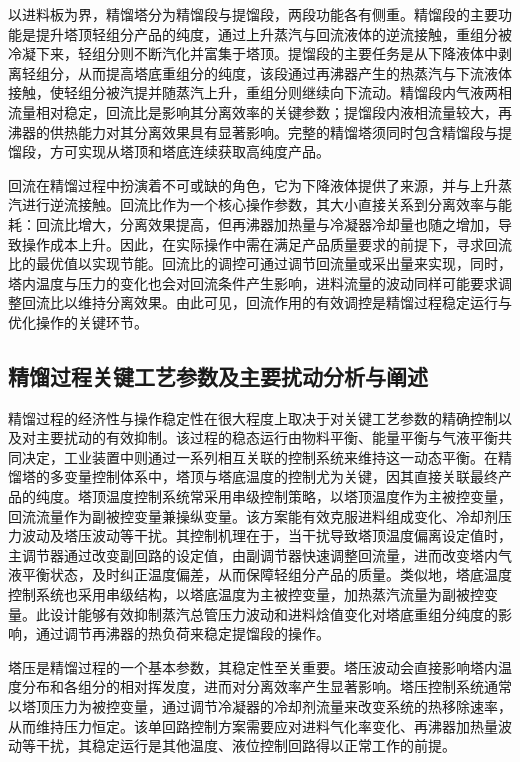 \documentclass[a4paper,zihao=-4]{article}
\numberwithin{equation}{section}
\numberwithin{figure}{section}
\numberwithin{table}{section}
\begin{document}
以进料板为界，精馏塔分为精馏段与提馏段，两段功能各有侧重。精馏段的主要功能是提升塔顶轻组分产品的纯度，通过上升蒸汽与回流液体的逆流接触，重组分被冷凝下来，轻组分则不断汽化并富集于塔顶。提馏段的主要任务是从下降液体中剥离轻组分，从而提高塔底重组分的纯度，该段通过再沸器产生的热蒸汽与下流液体接触，使轻组分被汽提并随蒸汽上升，重组分则继续向下流动。精馏段内气液两相流量相对稳定，回流比是影响其分离效率的关键参数；提馏段内液相流量较大，再沸器的供热能力对其分离效果具有显著影响。完整的精馏塔须同时包含精馏段与提馏段，方可实现从塔顶和塔底连续获取高纯度产品。

回流在精馏过程中扮演着不可或缺的角色，它为下降液体提供了来源，并与上升蒸汽进行逆流接触。回流比作为一个核心操作参数，其大小直接关系到分离效率与能耗：回流比增大，分离效果提高，但再沸器加热量与冷凝器冷却量也随之增加，导致操作成本上升。因此，在实际操作中需在满足产品质量要求的前提下，寻求回流比的最优值以实现节能。回流比的调控可通过调节回流量或采出量来实现，同时，塔内温度与压力的变化也会对回流条件产生影响，进料流量的波动同样可能要求调整回流比以维持分离效果。由此可见，回流作用的有效调控是精馏过程稳定运行与优化操作的关键环节。

\subsection{精馏过程关键工艺参数及主要扰动分析与阐述}

精馏过程的经济性与操作稳定性在很大程度上取决于对关键工艺参数的精确控制以及对主要扰动的有效抑制。该过程的稳态运行由物料平衡、能量平衡与气液平衡共同决定，工业装置中则通过一系列相互关联的控制系统来维持这一动态平衡。在精馏塔的多变量控制体系中，塔顶与塔底温度的控制尤为关键，因其直接关联最终产品的纯度。塔顶温度控制系统常采用串级控制策略，以塔顶温度作为主被控变量，回流流量作为副被控变量兼操纵变量。该方案能有效克服进料组成变化、冷却剂压力波动及塔压波动等干扰。其控制机理在于，当干扰导致塔顶温度偏离设定值时，主调节器通过改变副回路的设定值，由副调节器快速调整回流量，进而改变塔内气液平衡状态，及时纠正温度偏差，从而保障轻组分产品的质量。类似地，塔底温度控制系统也采用串级结构，以塔底温度为主被控变量，加热蒸汽流量为副被控变量。此设计能够有效抑制蒸汽总管压力波动和进料焓值变化对塔底重组分纯度的影响，通过调节再沸器的热负荷来稳定提馏段的操作。

塔压是精馏过程的一个基本参数，其稳定性至关重要。塔压波动会直接影响塔内温度分布和各组分的相对挥发度，进而对分离效率产生显著影响。塔压控制系统通常以塔顶压力为被控变量，通过调节冷凝器的冷却剂流量来改变系统的热移除速率，从而维持压力恒定。该单回路控制方案需要应对进料气化率变化、再沸器加热量波动等干扰，其稳定运行是其他温度、液位控制回路得以正常工作的前提。
\end{document}
